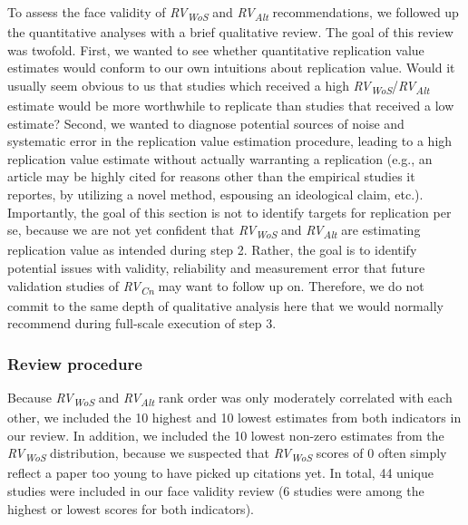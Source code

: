 \documentclass[
  man,floatsintext]{apa6}
\begin{document}
To assess the face validity of \emph{RV\textsubscript{WoS}} and \emph{RV\textsubscript{Alt}} recommendations, we followed up the quantitative analyses with a brief qualitative review. The goal of this review was twofold. First, we wanted to see whether quantitative replication value estimates would conform to our own intuitions about replication value. Would it usually seem obvious to us that studies which received a high \emph{RV\textsubscript{WoS}}/\emph{RV\textsubscript{Alt}} estimate would be more worthwhile to replicate than studies that received a low estimate? Second, we wanted to diagnose potential sources of noise and systematic error in the replication value estimation procedure, leading to a high replication value estimate without actually warranting a replication (e.g., an article may be highly cited for reasons other than the empirical studies it reportes, by utilizing a novel method, espousing an ideological claim, etc.). Importantly, the goal of this section is not to identify targets for replication per se, because we are not yet confident that \emph{RV\textsubscript{WoS}} and \emph{RV\textsubscript{Alt}} are estimating replication value as intended during step 2. Rather, the goal is to identify potential issues with validity, reliability and measurement error that future validation studies of \emph{RV\textsubscript{Cn}} may want to follow up on. Therefore, we do not commit to the same depth of qualitative analysis here that we would normally recommend during full-scale execution of step 3.

\hypertarget{review-procedure}{%
\subsubsection{Review procedure}\label{review-procedure}}

Because \emph{RV\textsubscript{WoS}} and \emph{RV\textsubscript{Alt}} rank order was only moderately correlated with each other, we included the 10 highest and 10 lowest estimates from both indicators in our review. In addition, we included the 10 lowest non-zero estimates from the \emph{RV\textsubscript{WoS}} distribution, because we suspected that \emph{RV\textsubscript{WoS}} scores of 0 often simply reflect a paper too young to have picked up citations yet. In total, 44 unique studies were included in our face validity review (6 studies were among the highest or lowest scores for both indicators).
\end{document}
